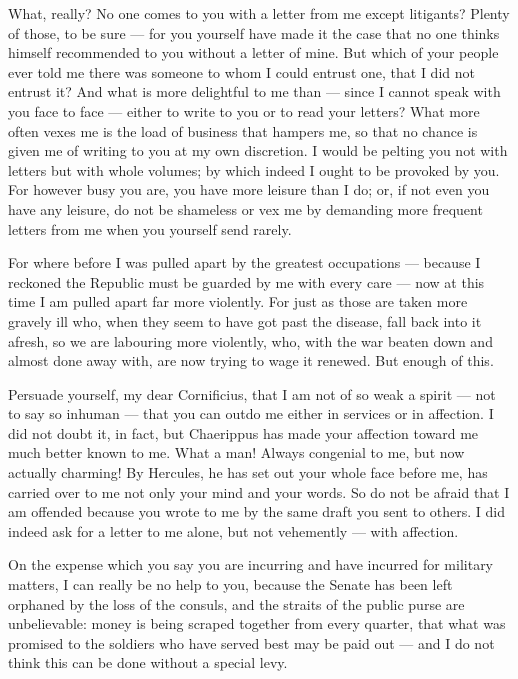 

 What, really? No one comes to you with a letter from me except litigants? Plenty of those, to be sure --- for you yourself have made it the case that no one thinks himself recommended to you without a letter of mine. But which of your people ever told me there was someone to whom I could entrust one, that I did not entrust it? And what is more delightful to me than --- since I cannot speak with you face to face --- either to write to you or to read your letters? What more often vexes me is the load of business that hampers me, so that no chance is given me of writing to you at my own discretion. I would be pelting you not with letters but with whole volumes; by which indeed I ought to be provoked by you. For however busy you are, you have more leisure than I do; or, if not even you have any leisure, do not be shameless or vex me by demanding more frequent letters from me when you yourself send rarely.

 For where before I was pulled apart by the greatest occupations --- because I reckoned the Republic must be guarded by me with every care --- now at this time I am pulled apart far more violently. For just as those are taken more gravely ill who, when they seem to have got past the disease, fall back into it afresh, so we are labouring more violently, who, with the war beaten down and almost done away with, are now trying to wage it renewed. But enough of this.

 Persuade yourself, my dear Cornificius, that I am not of so weak a spirit --- not to say so inhuman --- that you can outdo me either in services or in affection. I did not doubt it, in fact, but Chaerippus has made your affection toward me much better known to me. What a man! Always congenial to me, but now actually charming! By Hercules, he has set out your whole face before me, has carried over to me not only your mind and your words. So do not be afraid that I am offended because you wrote to me by the same draft you sent to others. I did indeed ask for a letter to me alone, but not vehemently --- with affection.

 On the expense which you say you are incurring and have incurred for military matters, I can really be no help to you, because the Senate has been left orphaned by the loss of the consuls, and the straits of the public purse are unbelievable: money is being scraped together from every quarter, that what was promised to the soldiers who have served best may be paid out --- and I do not think this can be done without a special levy.

